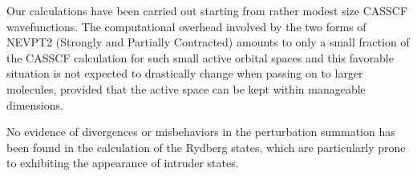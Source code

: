 Our calculations have been carried out starting from rather modest size
CASSCF wavefunctions. The computational overhead involved by the two forms
of NEVPT2 (Strongly and Partially Contracted) amounts to only a small
fraction of the CASSCF calculation for such small active orbital spaces and
this favorable situation is not expected to drastically change when passing
on to larger molecules, provided that the active space can be kept within
manageable dimensions.

No evidence of divergences or misbehaviors in the perturbation summation
has been found in the calculation of the Rydberg states, which are
particularly prone to exhibiting the appearance of intruder states. 
